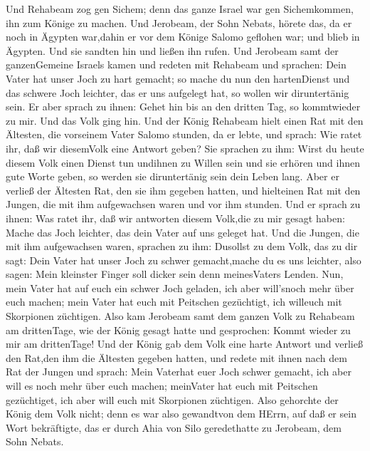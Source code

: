  Und Rehabeam zog gen Sichem; denn das ganze Israel war gen
Sichemkommen, ihn zum Könige zu machen.  Und Jerobeam, der
Sohn Nebats, hörete das, da er noch in Ägypten war,dahin er vor dem
Könige Salomo geflohen war; und blieb in Ägypten.  Und sie
sandten hin und ließen ihn rufen. Und Jerobeam samt der ganzenGemeine
Israels kamen und redeten mit Rehabeam und sprachen:  Dein
Vater hat unser Joch zu hart gemacht; so mache du nun den hartenDienst
und das schwere Joch leichter, das er uns aufgelegt hat, so wollen wir
diruntertänig sein.  Er aber sprach zu ihnen: Gehet hin bis
an den dritten Tag, so kommtwieder zu mir. Und das Volk ging hin.
 Und der König Rehabeam hielt einen Rat mit den Ältesten,
die vorseinem Vater Salomo stunden, da er lebte, und sprach: Wie ratet
ihr, daß wir diesemVolk eine Antwort geben?  Sie sprachen zu
ihm: Wirst du heute diesem Volk einen Dienst tun undihnen zu Willen sein
und sie erhören und ihnen gute Worte geben, so werden sie diruntertänig
sein dein Leben lang.  Aber er verließ der Ältesten Rat, den
sie ihm gegeben hatten, und hielteinen Rat mit den Jungen, die mit ihm
aufgewachsen waren und vor ihm stunden.  Und er sprach zu
ihnen: Was ratet ihr, daß wir antworten diesem Volk,die zu mir gesagt
haben: Mache das Joch leichter, das dein Vater auf uns geleget hat.
 Und die Jungen, die mit ihm aufgewachsen waren, sprachen
zu ihm: Dusollst zu dem Volk, das zu dir sagt: Dein Vater hat unser Joch
zu schwer gemacht,mache du es uns leichter, also sagen: Mein kleinster
Finger soll dicker sein denn meinesVaters Lenden.  Nun,
mein Vater hat auf euch ein schwer Joch geladen, ich aber will'snoch
mehr über euch machen; mein Vater hat euch mit Peitschen gezüchtigt, ich
willeuch mit Skorpionen züchtigen.  Also kam Jerobeam samt
dem ganzen Volk zu Rehabeam am drittenTage, wie der König gesagt hatte
und gesprochen: Kommt wieder zu mir am drittenTage!  Und
der König gab dem Volk eine harte Antwort und verließ den Rat,den ihm
die Ältesten gegeben hatten,  und redete mit ihnen nach dem
Rat der Jungen und sprach: Mein Vaterhat euer Joch schwer gemacht, ich
aber will es noch mehr über euch machen; meinVater hat euch mit
Peitschen gezüchtiget, ich aber will euch mit Skorpionen züchtigen.
 Also gehorchte der König dem Volk nicht; denn es war also
gewandtvon dem HErrn, auf daß er sein Wort bekräftigte, das er durch
Ahia von Silo geredethatte zu Jerobeam, dem Sohn Nebats. 

